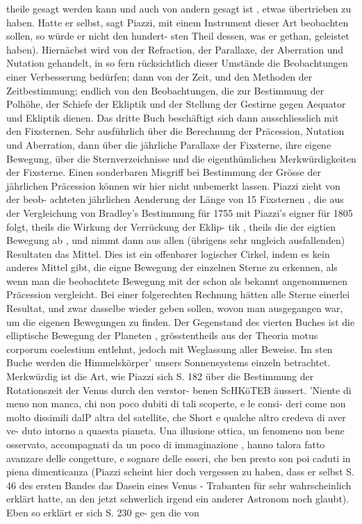 \documentclass[12pt,a4paper]{article}
\begin{document}
{{{{{{{{theile  gesagt  werden  kann  und  auch  von  andern  gesagt  ist ,  etwas  übertrieben  zu  haben.  Hatte  er selbst,  sagt  Piazzi,  mit  einem  Instrument  dieser  Art  beobachten  sollen,  so  würde  er  nicht  den  hundert- sten Theil  dessen,  was  er  gethan,  geleistet  haben).  Hiernäcbst  wird  von  der  Refraction,  der  Parallaxe, der  Aberration  und  Nutation  gehandelt,  in  so  fern  rücksichtlich  dieser  Umstände  die  Beobachtungen einer  Verbesserung  bedürfen;  dann  von  der  Zeit,  und  den  Methoden  der  Zeitbestimmung;  endlich  von den  Beobachtungen,  die  zur  Bestimmung  der  Polhöhe,  der  Schiefe  der  Ekliptik  und  der  Stellung  der Gestirne  gegen  Aequator  und  Ekliptik  dienen.  Das  dritte  Buch  beschäftigt  sich  dann  ausschliesslich mit  den  Fixsternen.  Sehr  ausführlich  über  die  Berechnung  der  Präcession,  Nutation  und  Aberration, dann  über  die  jährliche  Parallaxe  der  Fixsterne,  ihre  eigene  Bewegung,  über  die  Sternverzeichnisse  und die  eigenthümlichen  Merkwürdigkeiten  der  Fixsterne.  Einen  sonderbaren  Misgriff  bei  Bestimmung  der Grösse  der  jährlichen  Präcession  können  wir  hier  nicht  unbemerkt  lassen.  Piazzi  zieht  von  der  beob- achteten jährlichen  Aenderung  der  Länge  von  15  Fixsternen ,  die  aus  der  Vergleichung  von  Bradley's Bestimmung  für  1755  mit  Piazzi's  eigner  für  1805  folgt,  theils  die  Wirkung  der  Verrückung  der  Eklip- tik ,  theils  die  der  eigtien  Bewegung  ab ,  und  nimmt  dann  aus  allen  (übrigens  sehr  ungleich  ausfallenden) Resultaten  das  Mittel.  Dies  ist  ein  offenbarer  logischer  Cirkel,  indem  es  kein  anderes  Mittel  gibt,  die eigne  Bewegung  der  einzelnen  Sterne  zu  erkennen,  als  wenn  man  die  beobachtete  Bewegung  mit  der schon  als  bekannt  angenommenen  Präcession  vergleicht.  Bei  einer  folgerechten  Rechnung  hätten  alle Sterne  einerlei  Resultat,  und  zwar  dasselbe  wieder  geben  sollen,  wovon  man  ausgegangen  war,  um  die eigenen  Bewegungen  zu  finden. Der  Gegenstand  des  vierten  Buches  ist  die  elliptische  Bewegung  der  Planeten ,  grösstentheils  aus der  Theoria  motus  corporum  coelestium  entlehnt,  jedoch  mit  Weglassung  aller  Beweise. Im  sten  Buche  werden  die  Himmelskörper' unsers  Sonnensystems  einzeln  betrachtet.  Merkwürdig ist  die  Art,  wie  Piazzi  sich  S.  182  über  die  Bestimmung  der  Rotationszeit  der  Venus  durch  den  verstor- benen ScHKöTEB  äussert.  'Niente  di  meno  non  manca,  chi  non  poco  dubiti  di  tali  scoperte,  e  le  consi- deri  come  non  molto  dissimili  dalP  altra  del  satellite,  che  Short  e  qualche  altro  credeva  di  aver  ve- duto  intorno  a  quaesta  pianeta.  Una  illusione  ottica,  un  fenomeno  non  bene  osservato,  accompagnati da  un  poco  di  immaginazione ,  hanno  talora  fatto  avanzare  delle  congetture,  e  sognare  delle  esseri,  che ben  presto  son  poi  caduti  in  piena  dimenticanza  (Piazzi  scheint  hier  doch  vergessen  zu  haben,  dass  er selbst  S.  46  des  ersten  Bandes  das  Dasein  eines  Venus  -  Trabanten  für  sehr  wahrscheinlich  erklärt  hatte, an  den  jetzt  schwerlich  irgend  ein  anderer  Astronom  noch  glaubt).  Eben  so  erklärt  er  sich  S.  230  ge- gen die  von }}}}}}}}
\end{document}
